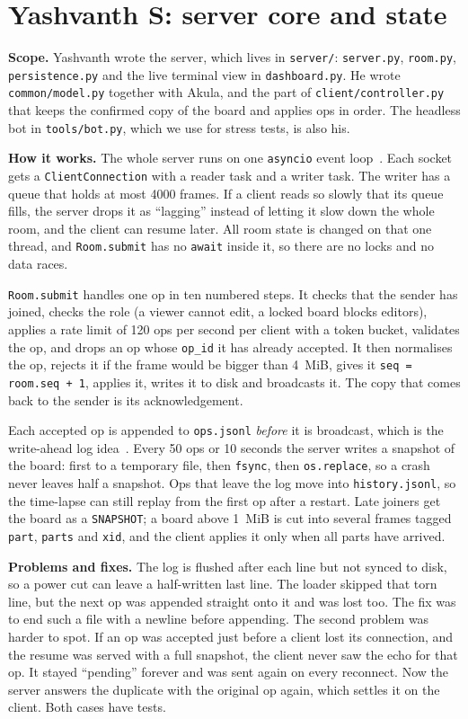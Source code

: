 \documentclass[11pt,a4paper]{article}
\newcommand{\file}[1]{\texttt{#1}}
\begin{document}
\section{Yashvanth S: server core and state}

\textbf{Scope.} Yashvanth wrote the server, which lives in \file{server/}: \file{server.py},
\file{room.py}, \file{persistence.py} and the live terminal view in \file{dashboard.py}. He wrote
\file{common/model.py} together with Akula, and the part of \file{client/controller.py} that keeps
the confirmed copy of the board and applies ops in order. The headless bot in \file{tools/bot.py},
which we use for stress tests, is also his.

\textbf{How it works.} The whole server runs on one \texttt{asyncio} event loop~\cite{asyncio}.
Each socket gets a \file{ClientConnection} with a reader task and a writer task. The writer has a
queue that holds at most 4000 frames. If a client reads so slowly that its queue fills, the server
drops it as ``lagging'' instead of letting it slow down the whole room, and the client can resume
later. All room state is changed on that one thread, and \file{Room.submit} has no \texttt{await}
inside it, so there are no locks and no data races.

\file{Room.submit} handles one op in ten numbered steps. It checks that the sender has joined,
checks the role (a viewer cannot edit, a locked board blocks editors), applies a rate limit of 120
ops per second per client with a token bucket, validates the op, and drops an op whose
\texttt{op\_id} it has already accepted. It then normalises the op, rejects it if the frame would
be bigger than 4~MiB, gives it \texttt{seq = room.seq + 1}, applies it, writes it to disk and
broadcasts it. The copy that comes back to the sender is its acknowledgement.

Each accepted op is appended to \file{ops.jsonl} \emph{before} it is broadcast, which is the
write-ahead log idea~\cite{aries}. Every 50 ops or 10 seconds the server writes a snapshot of the
board: first to a temporary file, then \texttt{fsync}, then \texttt{os.replace}, so a crash never
leaves half a snapshot. Ops that leave the log move into \file{history.jsonl}, so the time-lapse
can still replay from the first op after a restart. Late joiners get the board as a
\texttt{SNAPSHOT}; a board above 1~MiB is cut into several frames tagged \texttt{part},
\texttt{parts} and \texttt{xid}, and the client applies it only when all parts have arrived.

\textbf{Problems and fixes.} The log is flushed after each line but not synced to disk, so a power
cut can leave a half-written last line. The loader skipped that torn line, but the next op was
appended straight onto it and was lost too. The fix was to end such a file with a newline before
appending. The second problem was harder to spot. If an op was accepted just before a client lost
its connection, and the resume was served with a full snapshot, the client never saw the echo for
that op. It stayed ``pending'' forever and was sent again on every reconnect. Now the server
answers the duplicate with the original op again, which settles it on the client. Both cases have
tests.
\end{document}

